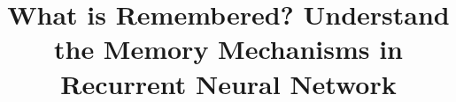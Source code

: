\documentclass{egpubl}
\title{What is Remembered? Understand the Memory Mechanisms in Recurrent Neural Network}
\begin{document}
\maketitle

\begin{abstract}
\end{abstract}





\end{document}
